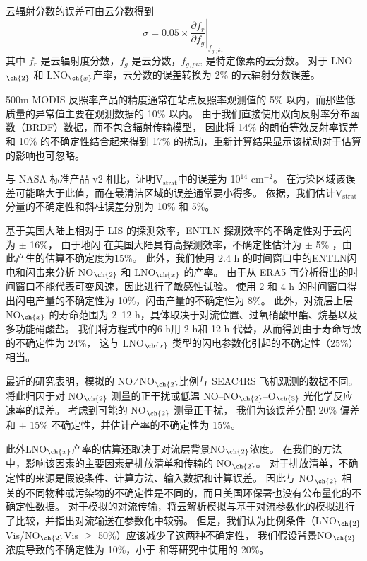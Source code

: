 云辐射分数的误差可由云分数得到
\begin{equation}
\sigma = 0.05 \times \left.\frac{\partial{f_r}}{\partial{f_g}}\right|_{f_{g,pix}}
\end{equation}
其中 $f_r$ 是云辐射度分数，$f_g$ 是云分数，$f_{g,pix}$ 是特定像素的云分数。
对于 LNO$_{\ch{2}}$ 和 LNO$_{\ch{x}}$产率，云分数的误差转换为 2\% 的云辐射分数误差。

500m MODIS 反照率产品的精度通常在站点反照率观测值的 5\% 以内，而那些低质量的异常值主要在观测数据的 10\% 以内\citep{Schaaf.2011}。
由于我们直接使用双向反射率分布函数（BRDF）数据，而不包含辐射传输模型，
因此将 14\% 的朗伯等效反射率误差和 10\% 的不确定性结合起来得到 17\% 的扰动\citep{Laughner.2019a}，重新计算结果显示该扰动对于估算的影响也可忽略。

与 NASA 标准产品 v2 相比，\citet{Krotkov.2017}证明V$_\textrm{strat}$中的误差为 10$^{14}$ cm$^{-2}$。
在污染区域该误差可能略大于此值，而在最清洁区域的误差通常要小得多\citep{Bucsela.2013}。
依据\citet{Allen.2019}，我们估计V$_\textrm{strat}$分量的不确定性和斜柱误差分别为 10\% 和 5\%。

基于美国大陆上相对于 LIS 的探测效率，ENTLN 探测效率的不确定性对于云闪为 $\pm$ 16\%，
由于地闪 在美国大陆具有高探测效率，不确定性估计为 $\pm$ 5\% \citep{Lapierre.2020}，由此产生的估算不确定度为15\%。
此外，我们使用 2.4 h 的时间窗口中的ENTLN闪电和闪击来分析 NO$_{\ch{2}}$ 和 LNO$_{\ch{x}}$ 的产率。
由于从 ERA5 再分析得出的时间窗口不能代表可变风速，因此进行了敏感性试验。
使用 2 和 4 h 的时间窗口得出闪电产量的不确定性为 10\%，闪击产量的不确定性为 8\%。
此外，对流层上层NO$_{\ch{x}}$ 的寿命范围为 2--12 h，具体取决于对流位置、过氧硝酸甲酯、烷基以及多功能硝酸盐\citep{Nault.2017}。
我们将方程式中的6 h用 2 h和 12 h 代替，从而得到由于寿命导致的不确定性为 24\%，
这与 LNO$_{\ch{x}}$ 类型的闪电参数化引起的不确定性（25\%）相当。

最近的研究表明，模拟的 NO ∕ NO$_{\ch{2}}$比例与 SEAC4RS 飞机观测的数据不同\citep{Travis.2016,Silvern.2018}。
\citet{Silvern.2018}将此归因于对 NO$_{\ch{2}}$ 测量的正干扰或低温 NO--NO$_{\ch{2}}$--O$_{\ch{3}}$ 光化学反应速率的误差。
考虑到可能的 NO$_{\ch{2}}$ 测量正干扰\citep{Allen.2019,Bucsela.2019}，
我们为该误差分配 20\% 偏差和 $\pm$ 15\% 不确定性，并估计产率的不确定性为 15\%。

此外LNO$_{\ch{x}}$产率的估算还取决于对流层背景NO$_{\ch{2}}$浓度。
在我们的方法中，影响该因素的主要因素是排放清单和传输的 NO$_{\ch{2}}$。
对于排放清单，不确定性的来源是假设条件、计算方法、输入数据和计算误差。
因此与 NO$_{\ch{2}}$ 相关的不同物种或污染物的不确定性是不同的，而且美国环保署也没有公布量化的不确定性数据。
对于模拟的对流传输，\citet{Li.2018}将云解析模拟与基于对流参数化的模拟进行了比较，并指出对流输送在参数化中较弱。
但是，我们认为比例条件（LNO$_{\ch{2}}$Vis/NO$_{\ch{2}}$Vis $\geq$ 50\%）应该减少了这两种不确定性，
我们假设背景NO$_{\ch{2}}$浓度导致的不确定性为 10\%，小于 \citet{Allen.2019}和\citet{Bucsela.2019}等研究中使用的 20\%。


